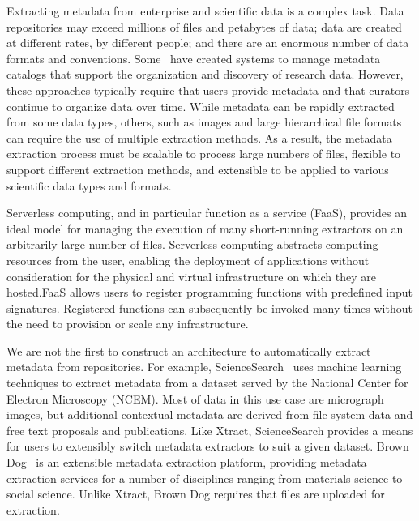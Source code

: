 \documentclass[sigconf]{acmart}
\newcommand{\tyler}[1]{}
\newcommand{\kyle}[1]{}
\newcommand{\tyler}[1]{{\textcolor{cyan}{ tyler: #1 }}}
\newcommand{\kyle}[1]{{\textcolor{purple}{ Kyle: #1 }}}
\newcommand{\name}{Xtract}
\begin{document}
\tyler{Add note here about the edge}
Extracting metadata from enterprise and scientific data is a complex task. 
Data repositories may exceed millions of files and petabytes of data;
data are created at different rates, by different people; 
and there are an enormous number of data formats and conventions. 
Some~\cite{egan2003vizier, welter2013nhgri, irods, dataverse} have created 
systems to manage metadata catalogs that
support the organization and discovery of research data. However, these approaches typically 
require that users provide metadata and that curators continue to organize data over time.
While metadata can be rapidly extracted from some data types, others, such as
images and large hierarchical file formats can require the use of multiple extraction methods.  
As a result, the metadata extraction process must be scalable to process large numbers
of files, flexible to support different extraction methods, and extensible
to be applied to various scientific data types and formats.

Serverless computing, and in particular function as a service (FaaS),
provides an ideal model for managing the execution of
many short-running extractors on an arbitrarily large number of files. 
Serverless computing abstracts computing resources from the user, enabling
the deployment of applications without consideration for the physical and virtual infrastructure on which 
they are hosted.FaaS allows users to register programming functions with predefined input signatures. 
Registered functions can subsequently be invoked many times
without the need to provision or scale any infrastructure.

\tyler{need to mention the name of our system first} \kyle{Do other papers have a separate RW section?}
We are not the first to construct an architecture to automatically extract metadata from repositories. 
For example, ScienceSearch~\cite{rodrigo2018sciencesearch} uses 
machine learning techniques to extract metadata from a dataset served by the National Center for Electron Microscopy (NCEM). 
Most of data in this use case are micrograph images, but additional contextual metadata are derived from file system 
data and free text proposals and publications. Like \name{}, ScienceSearch 
provides a means for users to extensibly switch metadata extractors to suit a given dataset.  
Brown Dog~\cite{padhy2015brown} is an extensible metadata extraction platform, 
providing metadata extraction services for a number of 
disciplines ranging from materials science to social science.
Unlike \name{}, Brown Dog requires that files are uploaded for extraction. 
\end{document}
